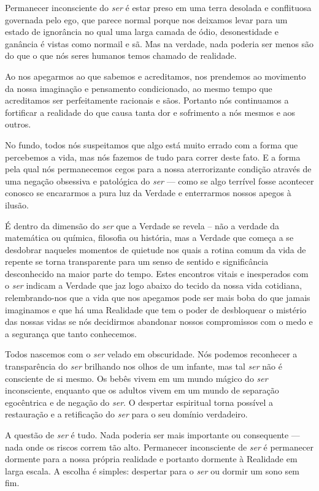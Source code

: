 Permanecer inconsciente do \emph{ser} é estar preso em uma terra desolada e conflituosa governada pelo ego, que parece normal porque nos deixamos levar para um estado de ignorância no qual uma larga camada de ódio, desonestidade e ganância é vistas como normail e sã. Mas na verdade, nada poderia ser menos são do que o que nós seres humanos temos chamado de realidade. 

Ao nos apegarmos ao que sabemos e acreditamos, nos prendemos ao movimento da nossa imaginação e pensamento condicionado, ao mesmo tempo que acreditamos ser perfeitamente racionais e sãos. Portanto nós continuamos a fortificar a realidade do que causa tanta dor e sofrimento a nós mesmos e aos outros.

No fundo, todos nós suspeitamos que algo está muito errado com a forma que percebemos a vida, mas nós fazemos de tudo para correr deste fato. E a forma pela qual nós permanecemos cegos para a nossa aterrorizante condição através de uma negação obsessiva e patológica do \emph{ser} --- como se algo terrível fosse acontecer conosco se encararmos a pura luz da Verdade e enterrarmos nossos apegos à ilusão. 

É dentro da dimensão do \emph{ser} que a Verdade se revela -- não a verdade da matemática ou química, filosofia ou história, mas a Verdade que começa a se desdobrar naqueles momentos de quietude nos quais a rotina comum da vida de repente se torna transparente para um senso de sentido e significância desconhecido na maior parte do tempo. Estes encontros vitais e inesperados com o \emph{ser} indicam a Verdade que jaz logo abaixo do tecido da nossa vida cotidiana, relembrando-nos que a vida que nos apegamos pode ser mais boba do que jamais imaginamos e que há uma Realidade que tem o poder de desbloquear o mistério das nossas vidas se nós decidirmos abandonar nossos compromissos com o medo e a segurança que tanto conhecemos.

Todos nascemos com o \emph{ser} velado em obscuridade. Nós podemos reconhecer a transparência do \emph{ser} brilhando nos olhos de um infante, mas tal \emph{ser} não é consciente de si mesmo. Os bebês vivem em um mundo mágico do \emph{ser} inconsciente, enquanto que os adultos vivem em um mundo de separação egocêntrica e de negação do \emph{ser}. O despertar espiritual torna possível a restauração e a retificação do \emph{ser} para o seu domínio verdadeiro. 

A questão de \emph{ser} é tudo. Nada poderia ser mais importante ou consequente --- nada onde os riscos correm tão alto. Permanecer inconsciente de \emph{ser} é permanecer dormente para a nossa própria realidade e portanto dormente à Realidade em larga escala. A escolha é simples: despertar para o \emph{ser} ou dormir um sono sem fim.
